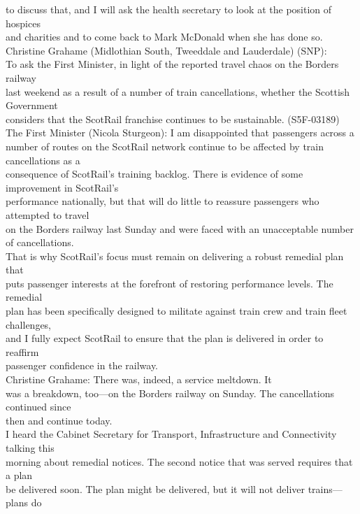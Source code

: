 \documentclass{article}
\begin{document}
\begin{description}
{to discuss that, and I will ask the health secretary to look at the position of hospices\\
and charities and to come back to Mark McDonald when she has done so.\\
Christine Grahame (Midlothian South, Tweeddale and Lauderdale) (SNP):\\
To ask the First Minister, in light of the reported travel chaos on the Borders railway\\
last weekend as a result of a number of train cancellations, whether the Scottish Government\\
considers that the ScotRail franchise continues to be sustainable. (S5F-03189)\\
The First Minister (Nicola Sturgeon): I am disappointed that passengers across a\\
number of routes on the ScotRail network continue to be affected by train cancellations as a\\
consequence of ScotRail’s training backlog. There is evidence of some improvement in ScotRail’s\\
performance nationally, but that will do little to reassure passengers who attempted to travel\\
on the Borders railway last Sunday and were faced with an unacceptable number of cancellations.\\
That is why ScotRail’s focus must remain on delivering a robust remedial plan that\\
puts passenger interests at the forefront of restoring performance levels. The remedial\\
plan has been specifically designed to militate against train crew and train fleet challenges,\\
and I fully expect ScotRail to ensure that the plan is delivered in order to reaffirm\\
passenger confidence in the railway.\\
Christine Grahame: There was, indeed, a service meltdown. It\\
was a breakdown, too—on the Borders railway on Sunday. The cancellations continued since\\
then and continue today.\\
I heard the Cabinet Secretary for Transport, Infrastructure and Connectivity talking this\\
morning about remedial notices. The second notice that was served requires that a plan\\
be delivered soon. The plan might be delivered, but it will not deliver trains—plans do\\
}
\end{description}
\end{document}

